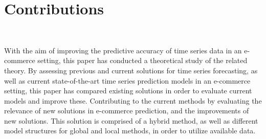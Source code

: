 
\section{Contributions}~\label{cont}
\label{section:Discussion:Contributions}


With the aim of improving the predictive accuracy of time series data in an e-commerce setting,
this paper has conducted a theoretical study of the related theory.
By assessing previous and current solutions for time series forecasting, as well as current state-of-the-art time series prediction models in an e-commerce setting,
this paper has compared existing solutions in order to evaluate current models and improve these.
Contributing to the current methods by evaluating the relevance of new solutions in e-commerce prediction,
and the improvements of new solutions.
This solution is comprised of a hybrid method, as well as different model structures for global and local methods,
in order to utilize available data.




\iffalse
What are the main contributions made to the field and how significant are these contribution.  
\fi
